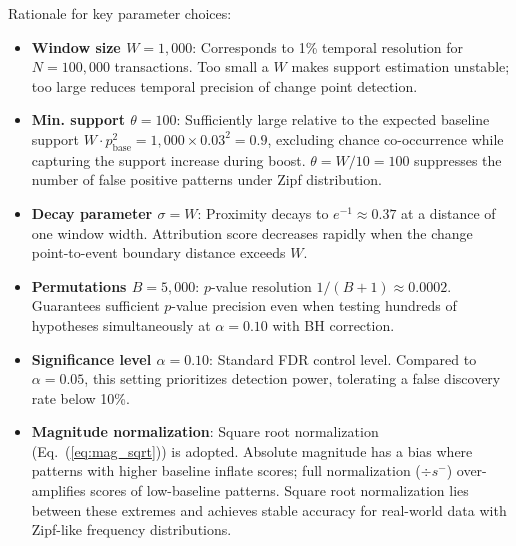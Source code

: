 
Rationale for key parameter choices:

\begin{itemize}
\item \textbf{Window size $W = 1{,}000$}:
    Corresponds to 1\% temporal resolution for $N = 100{,}000$ transactions.
    Too small a $W$ makes support estimation unstable;
    too large reduces temporal precision of change point detection.
\item \textbf{Min. support $\theta = 100$}:
    Sufficiently large relative to the expected baseline support
    $W \cdot p_{\text{base}}^2 = 1{,}000 \times 0.03^2 = 0.9$,
    excluding chance co-occurrence while capturing the support increase during boost.
    $\theta = W / 10 = 100$ suppresses the number of false positive patterns
    under Zipf distribution.
\item \textbf{Decay parameter $\sigma = W$}:
    Proximity decays to $e^{-1} \approx 0.37$ at a distance of one window width.
    Attribution score decreases rapidly when the change point-to-event boundary
    distance exceeds $W$.
\item \textbf{Permutations $B = 5{,}000$}:
    $p$-value resolution $1/(B+1) \approx 0.0002$.
    Guarantees sufficient $p$-value precision even when testing hundreds of hypotheses
    simultaneously at $\alpha = 0.10$ with BH correction.
\item \textbf{Significance level $\alpha = 0.10$}:
    Standard FDR control level.
    Compared to $\alpha = 0.05$, this setting prioritizes detection power,
    tolerating a false discovery rate below 10\%.
\item \textbf{Magnitude normalization}:
    Square root normalization (Eq.~(\ref{eq:mag_sqrt})) is adopted.
    Absolute magnitude has a bias where patterns with higher baseline inflate scores;
    full normalization ($\div s^{-}$) over-amplifies scores of low-baseline patterns.
    Square root normalization lies between these extremes and achieves
    stable accuracy for real-world data with Zipf-like frequency distributions.
\end{itemize}

